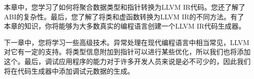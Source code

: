 本章中，您学习了如何将聚合数据类型和指针转换为LLVM IR代码。您还了解了ABI的复杂性。最后，您了解了将类和虚函数转换为LLVM IR的不同方法。有了本章的知识，你将能够为大多数真实的编程语言创建一个LLVM IR代码生成器。\par

下一章中，您将学习一些高级技术。异常处理在现代编程语言中相当常见，LLVM对它有一定的支持。将类型信息附加到指针可以进行某些优化，所以我们也将添加这个。最后，调试应用程序的能力对于许多开发人员来说是必不可少的，因此我们将在代码生成器中添加调试元数据的生成。\par

\newpage